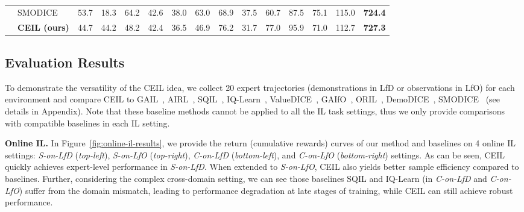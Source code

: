 \begin{table}[htbp]
{\begin{tabular}{clrrrrrrrrrrrrr}
          & SMODICE & \cellcolor{cyan!19}53.7  & 18.3  & \cellcolor{cyan!19}64.2  & \cellcolor{cyan!19}42.6  & \cellcolor{cyan!19}38.0  & 63.0  & 68.9  & \cellcolor{cyan!19}37.5  & 60.7  & 87.5  & \cellcolor{cyan!19}75.1  & \cellcolor{cyan!19}115.0  & \cellcolor{cyan!19}\textbf{724.4}  \\
          & \textbf{CEIL (ours)} & 44.7  & \cellcolor{cyan!19}44.2  & 48.2  & \cellcolor{cyan!19}42.4  & \cellcolor{cyan!19}36.5  & 46.9  & \cellcolor{cyan!19}76.2  & 31.7  & \cellcolor{cyan!19}77.0  & \cellcolor{cyan!19}95.9  & 71.0  & 112.7  &\cellcolor{cyan!19}\textbf{727.3}\\
    \bottomrule
    \end{tabular}%
    }
  \label{tab:offline-il-results}%
  \vspace{-5pt}
\end{table}%














\subsection{Evaluation Results}

To demonstrate the versatility of the CEIL idea, we collect 20 expert trajectories (demonstrations in LfD or observations in LfO) for each environment and compare CEIL to GAIL~\citep{ho2016generative}, AIRL~\citep{fu2017learning}, SQIL~\citep{reddy2019sqil}, IQ-Learn~\citep{garg2021iq}, ValueDICE~\citep{kostrikov2019imitation}, GAIfO~\citep{torabi2018generative},  ORIL~\citep{zolna2020offline}, DemoDICE~\citep{kim2022demodice},  SMODICE~\citep{ma2022smodice} (see details in Appendix).
Note that these baseline methods cannot be applied to all the IL task settings, thus we only provide comparisons with compatible baselines in each IL setting. 





\textbf{Online IL.} 
In Figure~\ref{fig:online-il-results}, we provide the return (cumulative rewards) curves of our method and baselines on 4 online IL settings: \textit{S-on-LfD} (\textit{top-left}), \textit{S-on-LfO} (\textit{top-right}), \textit{C-on-LfD} (\textit{bottom-left}), and \textit{C-on-LfO} (\textit{bottom-right}) settings. 
As can be seen, CEIL quickly achieves expert-level performance in \textit{S-on-LfD}. 
When extended to \textit{S-on-LfO}, CEIL also yields better sample efficiency compared to baselines. 
Further, considering the complex cross-domain setting, we can see those baselines SQIL and IQ-Learn (in \textit{C-on-LfD} and \textit{C-on-LfO}) suffer from the domain mismatch, leading to performance degradation at late stages of training, while CEIL can still achieve robust performance.







